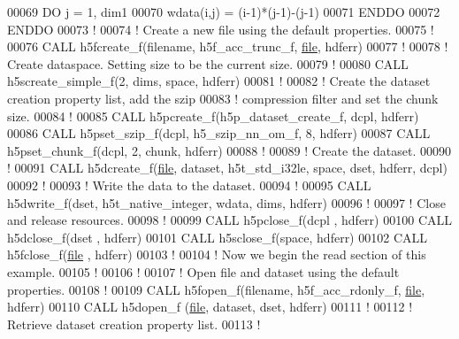 \begin{DoxyCode}
00069      \textcolor{keywordflow}{DO} j = 1, dim1
00070         wdata(i,j) = (i-1)*(j-1)-(j-1)
00071 \textcolor{keywordflow}{     ENDDO}
00072 \textcolor{keywordflow}{  ENDDO}
00073   \textcolor{comment}{!}
00074   \textcolor{comment}{! Create a new file using the default properties.}
00075   \textcolor{comment}{!}
00076   \textcolor{keyword}{CALL }h5fcreate\_f(filename, h5f\_acc\_trunc\_f, \hyperlink{structfile}{file}, hdferr)
00077   \textcolor{comment}{!}
00078   \textcolor{comment}{! Create dataspace.  Setting size to be the current size.}
00079   \textcolor{comment}{!}
00080   \textcolor{keyword}{CALL }h5screate\_simple\_f(2, dims, space, hdferr)
00081   \textcolor{comment}{!}
00082   \textcolor{comment}{! Create the dataset creation property list, add the szip}
00083   \textcolor{comment}{! compression filter and set the chunk size.}
00084   \textcolor{comment}{!}
00085   \textcolor{keyword}{CALL }h5pcreate\_f(h5p\_dataset\_create\_f, dcpl, hdferr)
00086   \textcolor{keyword}{CALL }h5pset\_szip\_f(dcpl, h5\_szip\_nn\_om\_f, 8, hdferr)
00087   \textcolor{keyword}{CALL }h5pset\_chunk\_f(dcpl, 2, chunk, hdferr)
00088   \textcolor{comment}{!}
00089   \textcolor{comment}{! Create the dataset.}
00090   \textcolor{comment}{!}
00091   \textcolor{keyword}{CALL }h5dcreate\_f(\hyperlink{structfile}{file}, dataset, h5t\_std\_i32le, space, dset, hdferr, dcpl)
00092   \textcolor{comment}{!}
00093   \textcolor{comment}{! Write the data to the dataset.}
00094   \textcolor{comment}{!}
00095   \textcolor{keyword}{CALL }h5dwrite\_f(dset, h5t\_native\_integer, wdata, dims, hdferr)
00096   \textcolor{comment}{!}
00097   \textcolor{comment}{! Close and release resources.}
00098   \textcolor{comment}{!}
00099   \textcolor{keyword}{CALL }h5pclose\_f(dcpl , hdferr)
00100   \textcolor{keyword}{CALL }h5dclose\_f(dset , hdferr)
00101   \textcolor{keyword}{CALL }h5sclose\_f(space, hdferr)
00102   \textcolor{keyword}{CALL }h5fclose\_f(\hyperlink{structfile}{file} , hdferr)
00103   \textcolor{comment}{!}
00104   \textcolor{comment}{! Now we begin the read section of this example.}
00105   \textcolor{comment}{!}
00106   \textcolor{comment}{!}
00107   \textcolor{comment}{! Open file and dataset using the default properties.}
00108   \textcolor{comment}{!}
00109   \textcolor{keyword}{CALL }h5fopen\_f(filename, h5f\_acc\_rdonly\_f, \hyperlink{structfile}{file}, hdferr)
00110   \textcolor{keyword}{CALL }h5dopen\_f (\hyperlink{structfile}{file}, dataset, dset, hdferr)
00111   \textcolor{comment}{!}
00112   \textcolor{comment}{! Retrieve dataset creation property list.}
00113   \textcolor{comment}{!}

\end{DoxyCode}
